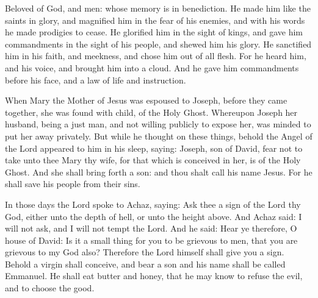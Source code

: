 

Beloved of God, and men: whose memory is in benediction.  He made him
like the saints in glory, and magnified him in the fear of his enemies, and
with his words he made prodigies to cease.  He glorified him in the sight of
kings, and gave him commandments in the sight of his people, and shewed him his
glory.  He sanctified him in his faith, and meekness, and chose him out of all
flesh.  For he heard him, and his voice, and brought him into a cloud.  And he
gave him commandments before his face, and a law of life and instruction.




When Mary the Mother of Jesus was
espoused to Joseph, before they came together, she was found with child, of the
Holy Ghost.  Whereupon Joseph her husband, being a just man, and not willing
publicly to expose her, was minded to put her away privately.  But while he
thought on these things, behold the Angel of the Lord appeared to him in his
sleep, saying: Joseph, son of David, fear not to take unto thee Mary thy wife,
for that which is conceived in her, is of the Holy Ghost.  And she shall bring
forth a son: and thou shalt call his name Jesus. For he shall save his people
from their sins.


\bigskip




In those days the Lord spoke to Achaz, saying:
Ask thee a sign of the Lord thy God, either unto the depth of
hell, or unto the height above.
And Achaz said: I will not ask, and I will not tempt the Lord.
And he said: Hear ye therefore, O house of David: Is it a small
thing for you to be grievous to men, that you are grievous to my God
also?
Therefore the Lord himself shall give you a sign. Behold a virgin
shall conceive, and bear a son and his name shall be called Emmanuel.
He shall eat butter and honey, that he may know to refuse the
evil, and to choose the good.



\label{Go.angelus}

